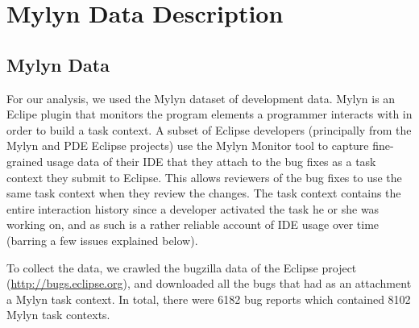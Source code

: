 \documentclass[times]{smrauth}
\begin{document}


\section{Mylyn Data Description}

\subsection{Mylyn Data}
For our analysis, we used the Mylyn dataset of development data.  Mylyn \cite{KM06} is an Eclipe plugin that monitors the program elements a programmer interacts with in order to build a task context. A subset of Eclipse developers (principally from the Mylyn and PDE Eclipse projects) use the Mylyn Monitor tool to capture fine-grained usage data of their IDE that they attach to the bug fixes as a task context they submit to Eclipse. This allows reviewers of the bug fixes to use the same task context when they review the changes. The task context contains the entire interaction history since a developer activated the task he or she was working on, and as such is a rather reliable account of IDE usage over time (barring a few issues explained below).


To collect the data, we crawled the bugzilla data of the Eclipse project (\url{http://bugs.eclipse.org}), and downloaded all the bugs that had as an attachment a Mylyn task context.  In total, there were 6182 bug reports which contained 8102 Mylyn task contexts.


\end{document}
